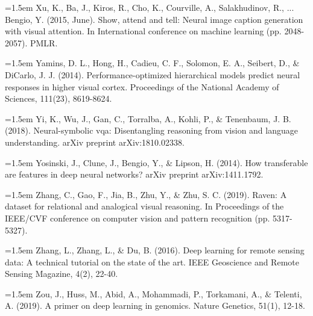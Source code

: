 \hangindent=1.5em
Xu, K., Ba, J., Kiros, R., Cho, K., Courville, A.,
Salakhudinov, R., ... Bengio, Y. (2015, June).
Show, attend and tell: Neural image caption generation
with visual attention.
In International conference on machine learning (pp. 2048-2057).
PMLR.
\par

\hangindent=1.5em
Yamins, D. L., Hong, H., Cadieu, C. F., Solomon, E. A.,
Seibert, D., \& DiCarlo, J. J. (2014).
Performance-optimized hierarchical models predict neural responses
in higher visual cortex.
Proceedings of the National Academy of Sciences, 111(23), 8619-8624.
\par

\hangindent=1.5em
Yi, K., Wu, J., Gan, C., Torralba, A., Kohli, P.,
\& Tenenbaum, J. B. (2018).
Neural-symbolic vqa: Disentangling reasoning from vision
and language understanding.
arXiv preprint arXiv:1810.02338.
\par

\hangindent=1.5em
Yosinski, J., Clune, J., Bengio, Y., \& Lipson, H. (2014).
How transferable are features in deep neural networks?
arXiv preprint arXiv:1411.1792.
\par

\hangindent=1.5em
Zhang, C., Gao, F., Jia, B., Zhu, Y., \& Zhu, S. C. (2019).
Raven: A dataset for relational and analogical visual reasoning.
In Proceedings of the IEEE/CVF conference on computer vision
and pattern recognition (pp. 5317-5327).
\par

\hangindent=1.5em
Zhang, L., Zhang, L., \& Du, B. (2016).
Deep learning for remote sensing data:
A technical tutorial on the state of the art.
IEEE Geoscience and Remote Sensing Magazine, 4(2), 22-40.
\par

\hangindent=1.5em
Zou, J., Huss, M., Abid, A., Mohammadi, P., Torkamani, A.,
\& Telenti, A. (2019).
A primer on deep learning in genomics.
Nature Genetics, 51(1), 12-18.
\par

\endgroup

